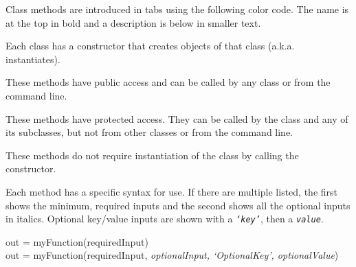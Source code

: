 \documentclass{aodatadocs}
\begin{document}
    \noindent Class methods are introduced in tabs using the following color code. The name is at the top in bold and a description is below in smaller text. 
    \begin{CtorTab}[Constructor]
        Each class has a constructor that creates objects of that class (a.k.a. instantiates). 
    \end{CtorTab}\vspace{1ex}

    \begin{MethodTab}
        These methods have public access and can be called by any class or from the command line. 
    \end{MethodTab}\vspace{1ex}

    \begin{ProtectTab}
        These methods have protected access. They can be called by the class and any of its subclasses, but not from other classes or from the command line. 
    \end{ProtectTab}\vspace{1ex}

    \begin{StaticTab}
        These methods do not require instantiation of the class by calling the constructor. 
    \end{StaticTab}\vspace{2ex}

    \noindent Each method has a specific syntax for use. If there are multiple listed, the first shows the minimum, required inputs and the second shows all the optional inputs in italics. Optional key/value inputs are shown with a \textit{\texttt{`key'}}, then a \textit{\texttt{value}}.
    
    \begin{CtorBox}
        out = myFunction(requiredInput)\\
        out = myFunction(requiredInput, \textit{optionalInput, `OptionalKey', optionalValue})
    \end{CtorBox}\vspace{2ex}
\end{document}
